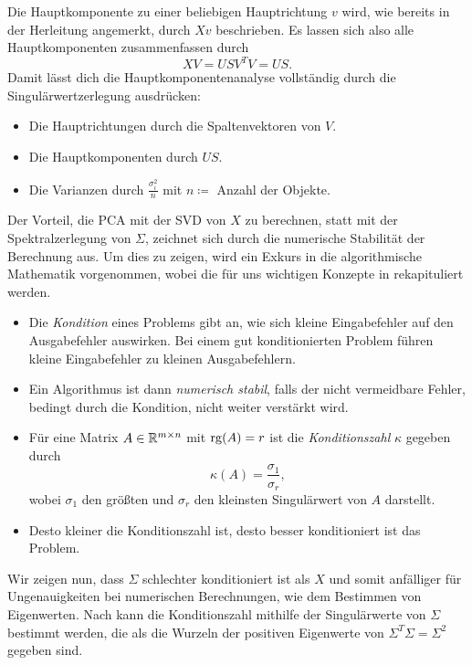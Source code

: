 Die Hauptkomponente zu einer beliebigen Hauptrichtung \(v\) wird, wie bereits in der Herleitung angemerkt, durch \(Xv\) beschrieben.  
Es lassen sich also alle Hauptkomponenten zusammenfassen durch 
\begin{equation*}
    XV = USV^{T}V = US.
\end{equation*}
Damit lässt dich die Hauptkomponentenanalyse vollständig durch die Singulärwertzerlegung ausdrücken:
\begin{itemize}
    \item Die Hauptrichtungen durch die Spaltenvektoren von \(V\).
    \item Die Hauptkomponenten durch \(US\).
    \item Die Varianzen durch \(\frac{\sigma_{i}^{2}}{n}\) mit \(n \coloneqq\) Anzahl der Objekte.
\end{itemize}

Der Vorteil, die PCA mit der SVD von \(X\) zu berechnen, statt mit der Spektralzerlegung von \(\Sigma\), zeichnet sich durch die numerische Stabilität der Berechnung aus.  
Um dies zu zeigen, wird ein Exkurs in die algorithmische Mathematik vorgenommen, wobei die für uns wichtigen Konzepte in  rekapituliert werden.
\begin{repitition}\label{rep:alma}\leavevmode
    \vspace{-14pt}
    \begin{itemize}[wide]
        \item Die \emph{Kondition} eines Problems gibt an, wie sich kleine Eingabefehler auf den Ausgabefehler auswirken.
            Bei einem gut konditionierten Problem führen kleine Eingabefehler zu kleinen Ausgabefehlern.
        \item Ein Algorithmus ist dann \emph{numerisch stabil}, falls der nicht vermeidbare Fehler, bedingt durch die Kondition, nicht weiter verstärkt wird.
        \item Für eine Matrix \(A \in \mathbb{R}^{m \times n}\) mit \(\operatorname{rg}(A)=r\)  ist die \emph{Konditionszahl} \(\kappa\) gegeben durch 
        \begin{equation*}
            \kappa(A) = \frac{\sigma_{1}}{\sigma_{r}},
        \end{equation*} 
        wobei \(\sigma_{1}\) den größten und \(\sigma_{r}\) den kleinsten Singulärwert von \(A\) darstellt.
        \item Desto kleiner die Konditionszahl ist, desto besser konditioniert ist das Problem.
    \end{itemize}
\end{repitition}
Wir zeigen nun, dass \(\Sigma\) schlechter konditioniert ist als \(X\) und somit anfälliger für Ungenauigkeiten bei numerischen Berechnungen, wie dem Bestimmen von Eigenwerten.  
Nach  kann die Konditionszahl mithilfe der Singulärwerte von \(\Sigma\) bestimmt werden, die als die Wurzeln der positiven Eigenwerte von \(\Sigma^{T}\Sigma = \Sigma^{2}\) gegeben sind.

